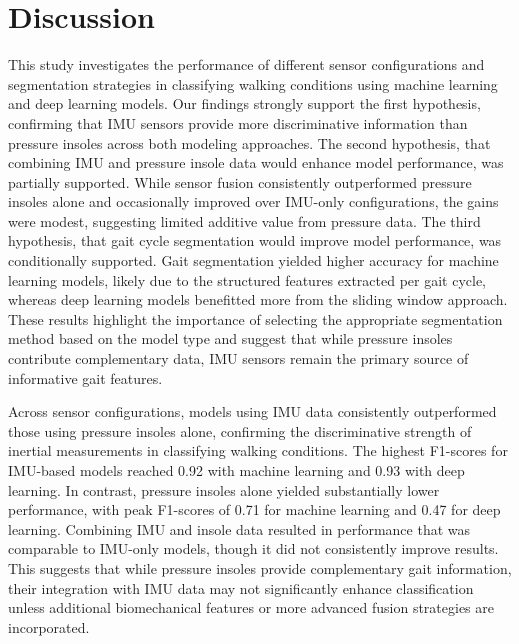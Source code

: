\documentclass[sensors,article,submit,pdftex,moreauthors]{Definitions/mdpi}
\begin{document}
\section{Discussion}
This study investigates the performance of different sensor configurations and segmentation strategies in classifying walking conditions using machine learning and deep learning models. Our findings strongly support the first hypothesis, confirming that IMU sensors provide more discriminative information than pressure insoles across both modeling approaches. The second hypothesis, that combining IMU and pressure insole data would enhance model performance, was partially supported. While sensor fusion consistently outperformed pressure insoles alone and occasionally improved over IMU-only configurations, the gains were modest, suggesting limited additive value from pressure data. The third hypothesis, that gait cycle segmentation would improve model performance, was conditionally supported. Gait segmentation yielded higher accuracy for machine learning models, likely due to the structured features extracted per gait cycle, whereas deep learning models benefitted more from the sliding window approach. These results highlight the importance of selecting the appropriate segmentation method based on the model type and suggest that while pressure insoles contribute complementary data, IMU sensors remain the primary source of informative gait features.

Across sensor configurations, models using IMU data consistently outperformed those using pressure insoles alone, confirming the discriminative strength of inertial measurements in classifying walking conditions. The highest F1-scores for IMU-based models reached 0.92 with machine learning and 0.93 with deep learning. In contrast, pressure insoles alone yielded substantially lower performance, with peak F1-scores of 0.71 for machine learning and 0.47 for deep learning. Combining IMU and insole data resulted in performance that was comparable to IMU-only models, though it did not consistently improve results. This suggests that while pressure insoles provide complementary gait information, their integration with IMU data may not significantly enhance classification unless additional biomechanical features or more advanced fusion strategies are incorporated.
\end{document}
